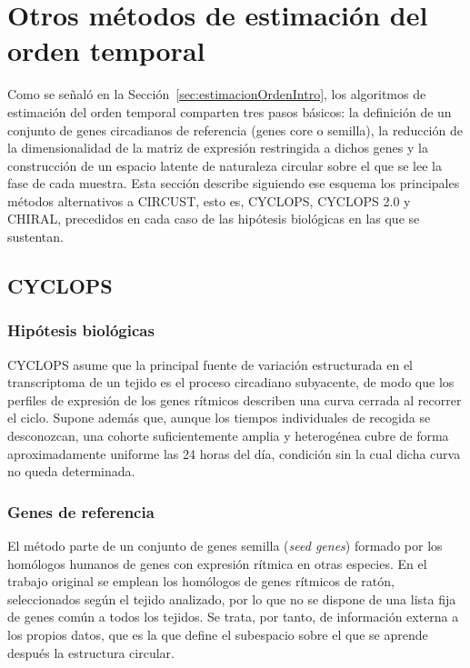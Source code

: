 \documentclass[12pt, a4paper]{report}
\begin{document}
\section{Otros métodos de estimación del orden temporal}
\label{sec:otrosMetodos}
Como se señaló en la Sección~\ref{sec:estimacionOrdenIntro}, los algoritmos de estimación del orden temporal comparten tres pasos básicos: la definición de un conjunto de genes circadianos de referencia (genes core o semilla), la reducción de la dimensionalidad de la matriz de expresión restringida a dichos genes y la construcción de un espacio latente de naturaleza circular sobre el que se lee la fase de cada muestra. Esta sección describe siguiendo ese esquema los principales métodos alternativos a CIRCUST, esto es, CYCLOPS, CYCLOPS 2.0 y CHIRAL, precedidos en cada caso de las hipótesis biológicas en las que se sustentan.

\subsection{CYCLOPS}

\subsubsection*{Hipótesis biológicas}
CYCLOPS \citep{CYCLOPS} asume que la principal fuente de variación estructurada en el transcriptoma de un tejido es el proceso circadiano subyacente, de modo que los perfiles de expresión de los genes rítmicos describen una curva cerrada al recorrer el ciclo. Supone además que, aunque los tiempos individuales de recogida se desconozcan, una cohorte suficientemente amplia y heterogénea cubre de forma aproximadamente uniforme las 24 horas del día, condición sin la cual dicha curva no queda determinada.

\subsubsection*{Genes de referencia}
El método parte de un conjunto de genes semilla (\textit{seed genes}) formado por los homólogos humanos de genes con expresión rítmica en otras especies. En el trabajo original se emplean los homólogos de genes rítmicos de ratón, seleccionados según el tejido analizado, por lo que no se dispone de una lista fija de genes común a todos los tejidos. Se trata, por tanto, de información externa a los propios datos, que es la que define el subespacio sobre el que se aprende después la estructura circular.
\end{document}
